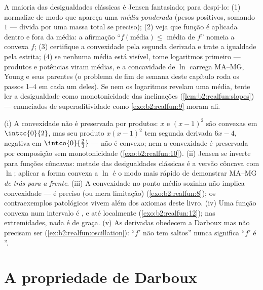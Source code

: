 \begin{method}\label{met:b2:realfun:spotting}
A maioria das desigualdades clássicas é Jensen fantasiado; para
despi-lo: (1) normalize de modo que apareça uma \emph{média ponderada}
(pesos positivos, somando $1$ --- divida por uma massa total se
preciso); (2) veja que função é aplicada dentro e fora
da média: a afirmação ``$f(\text{média}) \leq$
média de $f$'' nomeia a convexa $f$; (3) certifique a convexidade pela
segunda derivada e trate a igualdade pela estrita; (4)
se nenhuma média está visível, tome logaritmos primeiro --- produtos
e potências viram médias, e a concavidade de $\ln$ carrega
MA--MG, Young e seus parentes (o problema de fim de semana deste capítulo
roda os passos 1--4 em cada um deles). Se nem os logaritmos revelam
uma média, tente ler a desigualdade como monotonicidade
das inclinações (\cref{lem:b2:realfun:slopes}) ---
enunciados de superaditividade como \cref{exo:b2:realfun:9} moram
ali.
\end{method}

\begin{remark}\label{rem:b2:realfun:pitfalls}
(i) A convexidade não é preservada por produtos: $x$ e $(x - 1)^2$
são convexas em $\intcc{0}{2}$, mas seu produto $x(x-1)^2$ tem
segunda derivada $6x - 4$, negativa em
$\intco{0}{\frac23}$ --- não é convexo; nem a convexidade é preservada
por composição sem monotonicidade
(\cref{exo:b2:realfun:10}). (ii) Jensen se inverte para funções
côncavas: metade das desigualdades clássicas é a versão
côncava com $\ln$; aplicar a forma convexa a $\ln$ é o
modo mais rápido de demonstrar MA--MG \emph{de trás para a frente}. (iii) A
convexidade no ponto médio sozinha não implica convexidade --- é preciso  (ou
mera limitação) (\cref{exo:b2:realfun:8}); os
contraexemplos patológicos vivem além dos axiomas deste livro. (iv)
Uma função convexa num intervalo \emph{} é ,
e até localmente  (\cref{exo:b2:realfun:12}); nas
extremidades, nada é de graça. (v) As derivadas obedecem a Darboux mas
não precisam ser  (\cref{ex:b2:realfun:oscillation}):
``$f'$ não tem saltos'' nunca significa ``$f'$ é ''.
\end{remark}

\section{A propriedade de Darboux}


